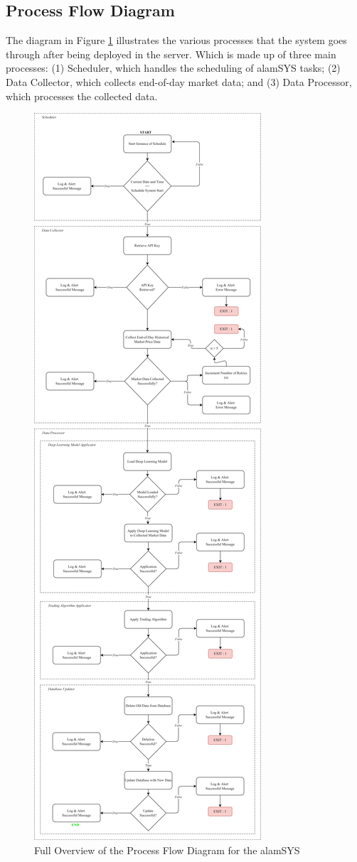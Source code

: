 \subsection{Process Flow Diagram}
\label{subsec:process_flow}
The diagram in Figure \ref{fig:process_flowchart} illustrates the various processes that the system goes 
through after being deployed in the server. Which is made up of three main processes: (1) Scheduler, 
which handles the scheduling of alamSYS tasks; (2) Data Collector, which collects end-of-day market data; 
and (3) Data Processor, which processes the collected data.

\begin{figure}[ht]
    \centering
    \includegraphics[height=0.90\textheight]{./assets/Chapter_3/PFC/ProcessFlowchart.png}
    \caption{Full Overview of the Process Flow Diagram for the alamSYS}
    \label{fig:process_flowchart}
\end{figure}
